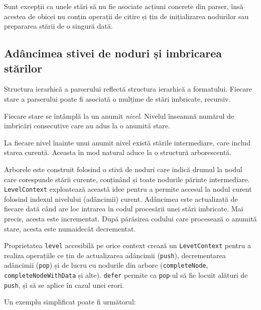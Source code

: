 \documentclass[a4paper,12pt]{report}
\begin{document}
Sunt excepții ca unele stări să nu fie asociate acțiuni concrete din parser,
însă acestea de obicei nu conțin operații de citire și țin de inițializarea nodurilor
sau prepararea stării de o singură dată.

\subsection{Adâncimea stivei de noduri și imbricarea stărilor}

Structura ierarhică a parserului reflectă structura ierarhică a formatului.
Fiecare stare a parserului poate fi asociată o mulțime de stări imbricate, recursiv.

Fiecare stare se întâmplă la un anumit \textit{nivel}. 
Nivelul înseamnă numărul de imbricări consecutive care au adus la o anumită stare.

La fiecare nivel înainte unui anumit nivel există stările intermediare, care includ starea curentă.
Aceasta în mod natural aduce la o structură arborescentă.

Arborele este construit folosind o stivă de noduri care
indică drumul la nodul care corespunde stării curente,
conținând și toate nodurile părinte intermediare.
\texttt{LevelContext} exploatează această idee pentru a permite accesul la
nodul curent folosind indexul nivelului (adâncimii) curent.
Adâncimea este actualizată de fiecare dată când are loc intrarea în codul procesării unei stări imbricate.
Mai precis, acesta este incrementat.
După părăsirea codului care procesează o anumită stare, acesta este numaidecât decrementat.

Proprietatea \texttt{level} accesibilă pe orice context crează un \texttt{LevetContext}
pentru a realiza operațiile ce țin de actualizarea adâncimii (\texttt{push}),
decrementarea adâncimii (\texttt{pop}) și de lucru cu nodurile
din arbore (\texttt{completeNode}, \texttt{completeNodeWithData} și alte).
\texttt{defer} permite ca \texttt{pop}-ul să fie locuit alături de \texttt{push},
și să se aplice în cazul unei erori. 

Un exemplu simplificat poate fi următorul:
\end{document}
